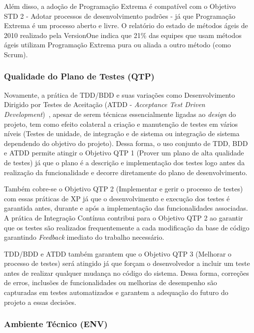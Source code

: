 
Além disso, a adoção de Programação Extrema é compatível com o
Objetivo STD 2 - Adotar processos de desenvolvimento padrões - já que
Programação Extrema é um processo aberto e livre. O relatório do
estado de métodos ágeis de 2010 realizado pela VersionOne indica que
21\% das equipes que usam métodos ágeis utilizam Programação Extrema
pura ou aliada a outro método (como Scrum).

\subsubsection{Qualidade do Plano de Testes (QTP)}
\label{sec:+qtp}

Novamente, a prática de TDD/BDD e suas variações como Desenvolvimento
Dirigido por Testes de Aceitação (ATDD - \textit{Acceptance Test
  Driven Development})~\cite{Owen2004}, apesar de serem técnicas
essencialmente ligadas ao \textit{design} do projeto, tem como efeito
colateral a criação e manutenção de testes em vários níveis (Testes de
unidade, de integração e de sistema ou integração de sistema
dependendo do objetivo do projeto). Dessa forma, o uso conjunto de
TDD, BDD e ATDD permite atingir o Objetivo QTP 1 (Prover um plano de
alta qualidade de testes) já que o plano é a descrição e implementação
dos testes logo antes da realização da funcionalidade e decorre
diretamente do plano de desenvolvimento.

Também cobre-se o Objetivo QTP 2 (Implementar e gerir o processo de
testes) com essas práticas de XP já que o desenvolvimento e execução
dos testes é garantida antes, durante e após a implementação das
funcionalidades associadas. A prática de Integração Contínua contribui
para o Objetivo QTP 2 ao garantir que os testes são realizados
frequentemente a cada modificação da base de código garantindo
\textit{Feedback} imediato do trabalho necessário.

TDD/BDD e ATDD também garantem que o Objetivo QTP 3 (Melhorar o
processo de testes) será atingido já que forçam o desenvolvedor a
incluir um teste antes de realizar qualquer mudança no código do
sistema. Dessa forma, correções de erros, inclusões de funcionalidades
ou melhorias de desempenho são capturadas em testes automatizados e
garantem a adequação do futuro do projeto a essas decisões.

\subsubsection{Ambiente Técnico (ENV)}
\label{sec:+env}

